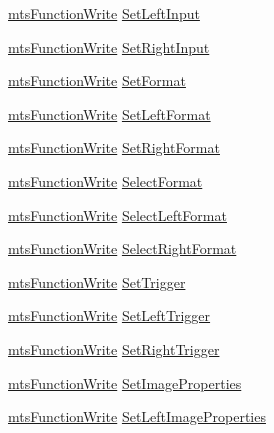 \begin{DoxyCompactItemize}
\item 
\hyperlink{classmts_function_write}{mts\-Function\-Write} \hyperlink{class_i_req_filter_source_video_capture_ab05c1c7aec272a4f79058f67cafd7ae1}{Set\-Left\-Input}
\item 
\hyperlink{classmts_function_write}{mts\-Function\-Write} \hyperlink{class_i_req_filter_source_video_capture_a65be646e690f42696d693b5649a5940e}{Set\-Right\-Input}
\item 
\hyperlink{classmts_function_write}{mts\-Function\-Write} \hyperlink{class_i_req_filter_source_video_capture_afe544baf681481dab6037d5114800da5}{Set\-Format}
\item 
\hyperlink{classmts_function_write}{mts\-Function\-Write} \hyperlink{class_i_req_filter_source_video_capture_a9363af0eb4d3f09c46522f58cc0d6183}{Set\-Left\-Format}
\item 
\hyperlink{classmts_function_write}{mts\-Function\-Write} \hyperlink{class_i_req_filter_source_video_capture_acbd209c704993935cbc202f3d11ba9de}{Set\-Right\-Format}
\item 
\hyperlink{classmts_function_write}{mts\-Function\-Write} \hyperlink{class_i_req_filter_source_video_capture_a7531cd4f6275e2044ad08049fa51ade6}{Select\-Format}
\item 
\hyperlink{classmts_function_write}{mts\-Function\-Write} \hyperlink{class_i_req_filter_source_video_capture_ab419fc7d7c6e2374f4b00c7647194412}{Select\-Left\-Format}
\item 
\hyperlink{classmts_function_write}{mts\-Function\-Write} \hyperlink{class_i_req_filter_source_video_capture_a4735a354070f1ad68635f08d10bd521c}{Select\-Right\-Format}
\item 
\hyperlink{classmts_function_write}{mts\-Function\-Write} \hyperlink{class_i_req_filter_source_video_capture_a98af73f8fa32e3104594021816f91175}{Set\-Trigger}
\item 
\hyperlink{classmts_function_write}{mts\-Function\-Write} \hyperlink{class_i_req_filter_source_video_capture_a226e2eaecff79d765568ffc0c5d1044d}{Set\-Left\-Trigger}
\item 
\hyperlink{classmts_function_write}{mts\-Function\-Write} \hyperlink{class_i_req_filter_source_video_capture_a2e4c7dd3ff46016da70c23ffe9730552}{Set\-Right\-Trigger}
\item 
\hyperlink{classmts_function_write}{mts\-Function\-Write} \hyperlink{class_i_req_filter_source_video_capture_a43f477dd29f145e55d5cad84666165cf}{Set\-Image\-Properties}
\item 
\hyperlink{classmts_function_write}{mts\-Function\-Write} \hyperlink{class_i_req_filter_source_video_capture_a076a7b2117147892512418de39ae4939}{Set\-Left\-Image\-Properties}

\end{DoxyCompactItemize}
